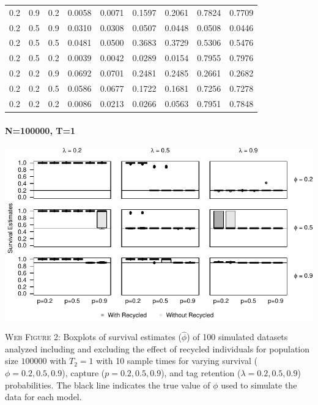 \documentclass[]{article}
\let\oldparagraph\paragraph
\renewcommand{\paragraph}[1]{\oldparagraph{#1}\mbox{}}
\begin{document}
\begin{table}[ht]
{\begin{tabular}{rrrrrrrrr}
  0.2 & 0.9 & 0.2 & 0.0058 & 0.0071 & 0.1597 & 0.2061 & 0.7824 & 0.7709 \\ 
  0.2 & 0.5 & 0.9 & 0.0310 & 0.0308 & 0.0507 & 0.0448 & 0.0508 & 0.0446 \\ 
  0.2 & 0.5 & 0.5 & 0.0481 & 0.0500 & 0.3683 & 0.3729 & 0.5306 & 0.5476 \\ 
  0.2 & 0.5 & 0.2 & 0.0039 & 0.0042 & 0.0289 & 0.0154 & 0.7955 & 0.7976 \\ 
  0.2 & 0.2 & 0.9 & 0.0692 & 0.0701 & 0.2481 & 0.2485 & 0.2661 & 0.2682 \\ 
  0.2 & 0.2 & 0.5 & 0.0586 & 0.0677 & 0.1722 & 0.1681 & 0.7256 & 0.7278 \\ 
  0.2 & 0.2 & 0.2 & 0.0086 & 0.0213 & 0.0266 & 0.0563 & 0.7951 & 0.7848 \\ 
   \hline
\end{tabular}
}
\endgroup
\end{table}

\newpage 

\paragraph{N=100000, T=1}\label{n100000-t1}

\includegraphics{Appendix_BW_files/figure-latex/figure2_survival_GJSTL2-1.pdf}

\textsc{Web Figure 2:} Boxplots of survival estimates (\(\hat{\phi}\))
of 100 simulated datasets analyzed including and excluding the effect of
recycled individuals for population size \(100000\) with \(T_2=1\) with
10 sample times for varying survival (\(\phi=0.2,0.5,0.9\)), capture
(\(p=0.2,0.5,0.9\)), and tag retention (\(\lambda=0.2,0.5,0.9\))
probabilities. The black line indicates the true value of \(\phi\) used
to simulate the data for each model.
\end{document}
